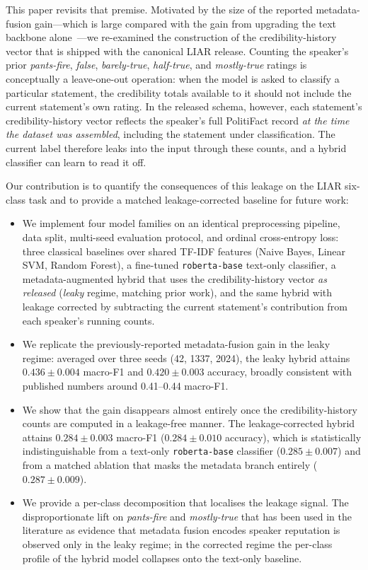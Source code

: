 \documentclass[journal]{IEEEtran}
\begin{document}
This paper revisits that premise. Motivated by the size of the reported metadata-fusion gain---which is large compared with the gain from upgrading the text backbone alone~\cite{devlin2019bert,raza2025}---we re-examined the construction of the credibility-history vector that is shipped with the canonical LIAR release. Counting the speaker's prior \emph{pants-fire}, \emph{false}, \emph{barely-true}, \emph{half-true}, and \emph{mostly-true} ratings is conceptually a leave-one-out operation: when the model is asked to classify a particular statement, the credibility totals available to it should not include the current statement's own rating. In the released schema, however, each statement's credibility-history vector reflects the speaker's full PolitiFact record \emph{at the time the dataset was assembled}, including the statement under classification. The current label therefore leaks into the input through these counts, and a hybrid classifier can learn to read it off.

Our contribution is to quantify the consequences of this leakage on the LIAR six-class task and to provide a matched leakage-corrected baseline for future work:

\begin{itemize}
  \item We implement four model families on an identical preprocessing pipeline, data split, multi-seed evaluation protocol, and ordinal cross-entropy loss: three classical baselines over shared TF-IDF features (Naive Bayes, Linear SVM, Random Forest), a fine-tuned \texttt{roberta-base} text-only classifier, a metadata-augmented hybrid that uses the credibility-history vector \emph{as released} (\emph{leaky} regime, matching prior work), and the same hybrid with leakage corrected by subtracting the current statement's contribution from each speaker's running counts.
  \item We replicate the previously-reported metadata-fusion gain in the leaky regime: averaged over three seeds (42, 1337, 2024), the leaky hybrid attains $0.436 \pm 0.004$ macro-F1 and $0.420 \pm 0.003$ accuracy, broadly consistent with published numbers around 0.41--0.44 macro-F1.
  \item We show that the gain disappears almost entirely once the credibility-history counts are computed in a leakage-free manner. The leakage-corrected hybrid attains $0.284 \pm 0.003$ macro-F1 ($0.284 \pm 0.010$ accuracy), which is statistically indistinguishable from a text-only \texttt{roberta-base} classifier ($0.285 \pm 0.007$) and from a matched ablation that masks the metadata branch entirely ($0.287 \pm 0.009$).
  \item We provide a per-class decomposition that localises the leakage signal. The disproportionate lift on \emph{pants-fire} and \emph{mostly-true} that has been used in the literature as evidence that metadata fusion encodes speaker reputation is observed only in the leaky regime; in the corrected regime the per-class profile of the hybrid model collapses onto the text-only baseline.
\end{itemize}
\end{document}
